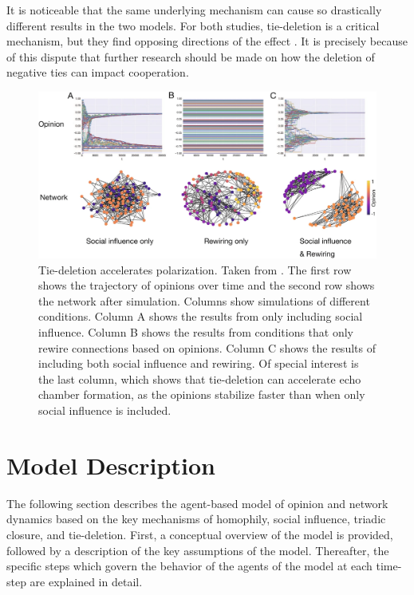 \documentclass[11pt]{article}
\begin{document}
\noindent It is noticeable that the same underlying mechanism can cause so drastically different results in the two models. For both studies, tie-deletion is a critical mechanism, but they find opposing directions of the effect \cite{santos_cooperation_2006,sasahara_social_2021}. It is precisely because of this dispute that further research should be made on how the deletion of negative ties can impact cooperation.

\begin{figure}[H]
    \centering
    \includegraphics[width=.8\linewidth]{../plots/references/echo_chambers.png}
  \caption{Tie-deletion accelerates polarization. Taken from \protect{}. The first row shows the trajectory of opinions over time and the second row shows the network after simulation. Columns show simulations of different conditions. Column A shows the results from only including social influence. Column B shows the results from conditions that only rewire connections based on opinions. Column C shows the results of including both social influence and rewiring. Of special interest is the last column, which shows that tie-deletion can accelerate echo chamber formation, as the opinions stabilize faster than when only social influence is included.}
  \label{fig:echo_chambers}
\end{figure}

\section{Model Description}
The following section describes the agent-based model of opinion and network dynamics based on the key mechanisms of homophily, social influence, triadic closure, and tie-deletion. First, a conceptual overview of the model is provided, followed by a description of the key assumptions of the model. Thereafter, the specific steps which govern the behavior of the agents of the model at each time-step are explained in detail. 
\end{document}
